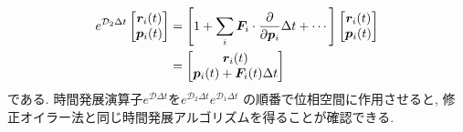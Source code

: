 \begin{align}
 e^{\mathcal{D}_{2} \Delta t}
 \begin{bmatrix}
  \bm{r}_{i} (t) \\
  \bm{p}_{i} (t) \\
 \end{bmatrix}
 &= \left[
          1 + \sum_{i} \bm{F}_{i}
              \cdot \frac{\partial}{\partial \bm{p}_{i}} \Delta t + \cdots
    \right]
 \begin{bmatrix}
  \bm{r}_{i} (t) \\
  \bm{p}_{i} (t) \\
 \end{bmatrix}
 \notag \\
 &=
 \begin{bmatrix}
  \bm{r}_{i} (t)                                            \\
  \bm{p}_{i} (t) + \bm{F}_{i}(t) \Delta t               \\
 \end{bmatrix}
 \label{eq:1.36}
\end{align}
である.
時間発展演算子$e^{\mathcal{D} \Delta t}$を$e^{\mathcal{D}_{2} \Delta t}e^{\mathcal{D}_{1} \Delta t}$
の順番で位相空間に作用させると, 修正オイラー法と同じ時間発展アルゴリズムを得ることが確認できる.

